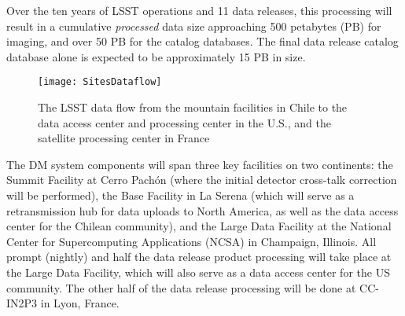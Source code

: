 Over the ten years of LSST operations and 11 data releases, this processing will result in a cumulative {\em processed} data size
approaching 500 petabytes (PB) for imaging, and over 50 PB for the
catalog databases. The final data release catalog database alone is expected
to be approximately 15 PB in size.
\\


\begin{figure*}
\hskip 0.01in
\texttt{[image: SitesDataflow]}
\caption{The LSST data flow from the mountain facilities in
Chile to the data access center and processing center in the U.S., and
the satellite processing center in France}
\label{Fig:DM2}
\end{figure*}

The DM system components will span three key facilities on two
continents: the Summit Facility at  Cerro Pach\'on (where the initial
detector cross-talk
correction will be performed), the Base Facility in La Serena (which will serve
as a retransmission hub for data
uploads to North America, as well as the data access center for the Chilean
community), and the Large Data Facility at the National Center
for Supercomputing Applications (NCSA) in Champaign, Illinois.
All prompt (nightly) and half the data release product processing will take place at the
Large Data Facility, which will also serve as a data access center
for the US community.
The other half of the data release processing will be done at CC-IN2P3 in
Lyon, France.

